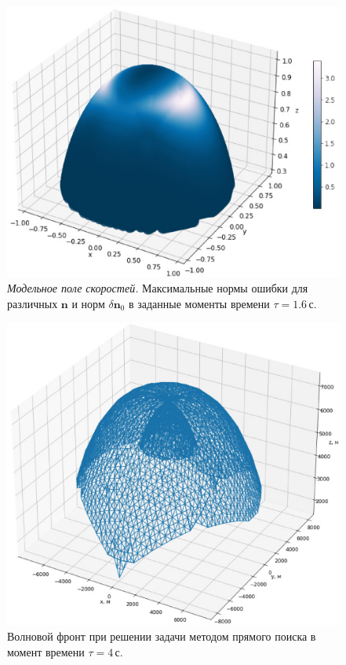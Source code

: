 \documentclass[12pt, cleqn, a4paper]{article}
\newcommand{\bfv}[1]{\mathbf{#1}}
\newcommand{\dn}{\delta \bfv{n}}
\begin{document}
\begin{figure}[h] 
\centering
\includegraphics[width=1.0\linewidth]{grad_gauss.eps}
\caption{\textit{Модельное поле скоростей.} Максимальные нормы ошибки для различных $\bfv{n}$ и норм $\dn_0$ в заданные моменты времени $\tau = 1.6$\,с.}
\label{fig:grad_gauss}
\end{figure}

\begin{figure}[h] 
\centering
\includegraphics[width=1.0\linewidth]{direct_search.eps}
\caption{Волновой фронт при решении задачи методом прямого поиска в момент времени $\tau = 4$\,с.}
\label{fig:direct_search}
\end{figure}
\end{document}
